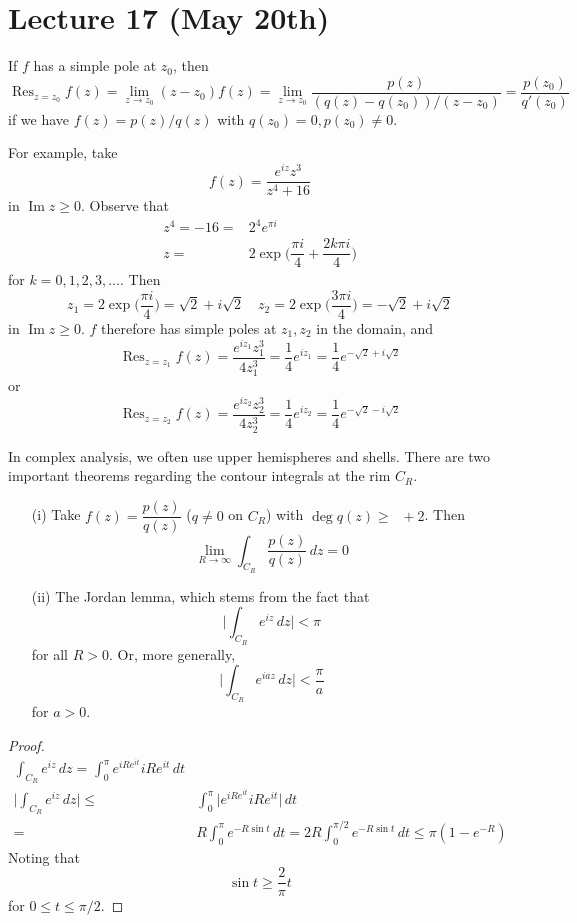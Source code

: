\section{Lecture 17 (May 20th)}
\begin{rmk}
If $f$ has a simple pole at $z_0$, then
\[\mathop{\mathrm{Res}}_{z=z_0}f(z)=\lim _{z\rightarrow z_0}(z-z_0)f(z)=\lim _{z\rightarrow z_0}\dfrac{p(z)}{(q(z)-q(z_0))/(z-z_0)}=\dfrac{p(z_0)}{q'(z_0)}\]
if we have $f(z)=p(z)/q(z)$ with $q(z_0)=0,p(z_0)\ne 0$.
\end{rmk}
\vspace{2ex}
\begin{ex}
For example, take
\[f(z)=\dfrac{e^{iz}z^3}{z^{4}+16}\]
in $\mathop{\mathrm{Im}}z\geq 0$. Observe that
\begin{align*}
z^{4}=-16=&2^{4}e^{\pi i}\\
z=&2\exp \Big(\dfrac{\pi i}{4}+\dfrac{2k\pi i}{4}\Big)
\end{align*}
for $k=0,1,2,3,\ldots $. Then
\[z_1=2\exp \Big(\dfrac{\pi i}{4}\Big)=\sqrt{2}+i\sqrt{2}\quad z_2=2\exp \Big(\dfrac{3\pi i}{4}\Big)=-\sqrt{2}+i\sqrt{2}\]
in $\mathop{\mathrm{Im}}z\geq 0$. $f$ therefore has simple poles at $z_1, z_2$ in the domain, and
\[\mathop{\mathrm{Res}}_{z=z_1}f(z)=\dfrac{e^{iz_1}z_1^3}{4z_1^{3}}=\dfrac{1}{4}e^{iz_1}=\dfrac{1}{4}e^{-\sqrt{2}+i\sqrt{2}}\]
or
\[\mathop{\mathrm{Res}}_{z=z_2}f(z)=\dfrac{e^{iz_2}z_2^3}{4z_2^{3}}=\dfrac{1}{4}e^{iz_2}=\dfrac{1}{4}e^{-\sqrt{2}-i\sqrt{2}}\]
\end{ex}
\vspace{2ex}
\begin{thm}
In complex analysis, we often use upper hemispheres and shells. There are two important theorems regarding the contour integrals at the rim $C_{R}$. 
\begin{itemize}
\item[(i)] Take $f(z)=\dfrac{p(z)}{q(z)}$ ($q\ne 0$ on $C_{R}$) with $\mathop{\mathrm{deg}}q(z)\geq \mathop{\mathrm{p(z)}}+2$. Then 
\[\lim _{R\rightarrow \infty }\int _{C_{R}}\dfrac{p(z)}{q(z)}\,dz=0\]
\item[(ii)] The Jordan lemma, which stems from the fact that
\[\Big|\int _{C_{R}}e^{iz}\,dz\Big|<\pi \]
for all $R>0$. Or, more generally,
\[\Big|\int _{C_{R}}e^{iaz}\,dz\Big|<\dfrac{\pi }{a}\]
for $a>0$. 
\end{itemize}
\end{thm}
\vspace{2ex}
\begin{proof}
\begin{align*}
\int _{C_{R}}e^{iz}\,dz=^{}\int ^{\pi }_{0}e^{iRe^{it}}iRe^{it}\,dt\\
\Big|\int _{C_{R}}e^{iz}\,dz\Big|\leq& \int ^{\pi }_{0}\Big|e^{iRe^{it}}iRe^{it}\Big|\,dt\\
=&R\int ^{\pi }_{0}e^{-R\sin t}\,dt=2R\int ^{\pi /2}_{0}e^{-R\sin t}\,dt\leq \pi (1-e^{-R})
\end{align*}
Noting that
\[\sin t\geq \dfrac{2}{\pi }t\]
for $0\leq t\leq \pi /2$.
\end{proof}
